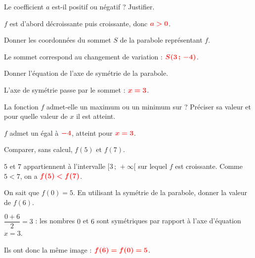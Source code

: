\documentclass[11pt,a4paper]{book}
\begin{document}
\begin{enumMet}
	\item Le coefficient $a$ est-il positif ou négatif ? Justifier.

	\begin{corrBox}
		$f$ est d'abord décroissante puis croissante, donc $\mRouge{a>0}$.
	\end{corrBox}

	\item Donner les coordonnées du sommet $S$ de la parabole représentant $f$.

	\begin{corrBox}
		Le sommet correspond au changement de variation : $\mRouge{S(3\,;\,-4)}$.
	\end{corrBox}

	\item Donner l'équation de l'axe de symétrie de la parabole.

	\begin{corrBox}
		L'axe de symétrie passe par le sommet : $\mRouge{x=3}$.
	\end{corrBox}

	\item La fonction $f$ admet-elle un maximum ou un minimum sur \R ? Préciser sa valeur et pour quelle valeur de $x$ il est atteint.

	\begin{corrBox}
		$f$ admet un  égal à $\mRouge{-4}$, atteint pour $\mRouge{x=3}$.
	\end{corrBox}

	\item Comparer, sans calcul, $f(5)$ et $f(7)$.

	\begin{corrBox}
		$5$ et $7$ appartiennent à l'intervalle $[3\,;\,+\infty[$ sur lequel $f$ est croissante. Comme $5<7$, on a $\mRouge{f(5)<f(7)}$.
	\end{corrBox}

	\item On sait que $f(0)=5$. En utilisant la symétrie de la parabole, donner la valeur de $f(6)$.

	\begin{corrBox}
		$\dfrac{0+6}{2}=3$ : les nombres $0$ et $6$ sont symétriques par rapport à l'axe d'équation $x=3$.

		Ils ont donc la même image : $\mRouge{f(6)=f(0)=5}$.
	\end{corrBox}
\end{enumMet}
\end{document}
